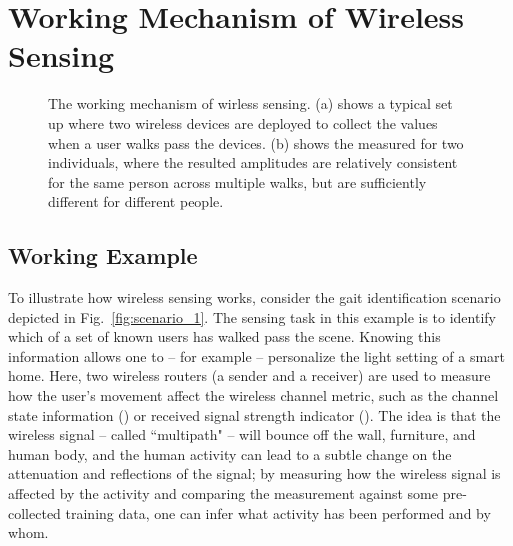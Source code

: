 \section{Working Mechanism of Wireless Sensing\label{sec:mechanism}}
\begin{figure} [t!]
       \centering
     \caption{The working mechanism of wirless sensing. (a) shows a typical set up where two wireless devices are deployed
     to collect the \CSI values when a user walks pass the devices. (b)  shows the measured \CSI  for two
     individuals, where the resulted \CSI amplitudes are relatively consistent for the same person across multiple walks, but are sufficiently different for different people.}
     \label{fig:csi_demo}
\end{figure}


\subsection{Working Example}
To illustrate how wireless sensing works, consider the gait identification scenario depicted in Fig.~\ref{fig:scenario_1}. The sensing task
in this example is to identify which of a set of known users has walked pass the scene. Knowing this information allows one to -- for
example -- personalize the light setting of a smart home. Here, two wireless routers (a sender and a receiver) are used to measure how the
user's movement affect the wireless channel metric, such as the channel state information (\CSI) or received signal strength indicator
(\RSSI). The idea is that the wireless signal -- called ``multipath" -- will bounce off the wall, furniture, and human body, and the human
activity can lead to a subtle change on the attenuation and reflections of the signal; by measuring how the wireless signal is affected by
the activity and comparing the measurement against some pre-collected training data, one can infer what activity has been performed and by
whom.

